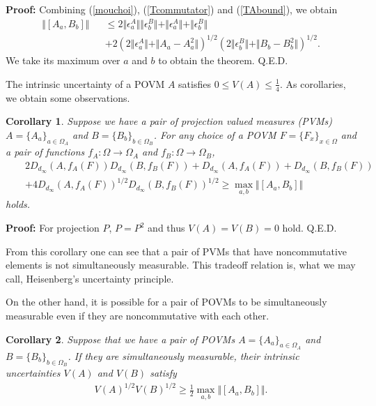 \documentclass[showpacs,preprintnumbers,amsmath,amssymb]{revtex4}
\newtheorem{corollary}{Corollary}
\begin{document}
{\bf Proof:}
Combining (\ref{mouchoi}), (\ref{Tcommutator}) and 
(\ref{TAbound}), we obtain
\begin{eqnarray}
\Vert [A_a,B_b]
\Vert &&
\leq 2\Vert \epsilon^A_a \Vert \Vert \epsilon^B_b \Vert 
+\Vert \epsilon^A_a \Vert +\Vert \epsilon^B_b \Vert 
\nonumber
\\
&&
+2(2\Vert \epsilon^A_a\Vert +\Vert A_a-A_a^2\Vert
)^{1/2}
(2\Vert \epsilon^B_b\Vert +\Vert B_b-B_b^2\Vert
)^{1/2}.
\label{proof}
\end{eqnarray}
 We take its maximum over  
$a$ and $b$ to obtain the theorem.
\hfill Q.E.D. 
\par
The intrinsic uncertainty of a POVM $A$ satisfies 
$0\leq V(A)\leq \frac{1}{4}$. 
As corollaries, we obtain some observations.
\begin{corollary}\label{forPVM}
Suppose we have a pair of projection valued measures (PVMs) 
$A=\{A_a\}_{a\in \Omega_A}$ and $B=\{B_b\}_{b \in \Omega_B}$. 
For any choice of a POVM 
$F=\{F_x\}_{x\in \Omega}$ and a pair of functions 
$f_A: \Omega \to \Omega_A$ and $f_B: \Omega \to \Omega_B$, 
\begin{eqnarray*}
&&2 D_{d_{\infty}}(A, f_A(F))D_{d_{\infty}}(B, f_B(F))
+D_{d_{\infty}}(A,f_A(F))+D_{d_{\infty}}(B,f_B(F))
\\
&&
+4 D_{d_{\infty}}(A,f_A(F))^{1/2}D_{d_{\infty}}(B,f_B(F))^{1/2}
\geq \max_{a,b}\Vert[A_a,B_b]\Vert
\end{eqnarray*}
holds.
\end{corollary}
{\bf Proof:}
For projection $P$, $P =P^2$ and thus $V(A)=V(B)=0$ hold.
\hfill Q.E.D.
\par
From this corollary one can see that 
a pair of PVMs that have noncommutative elements 
is not simultaneously measurable. 
This tradeoff relation is, what we may call, 
Heisenberg's uncertainty principle. 
\par
On the other hand, it is possible for a pair of POVMs 
to be simultaneously measurable even if they are 
noncommutative with each other. 
\begin{corollary}
Suppose that we have a pair of POVMs $A=\{A_a\}_{a\in \Omega_A}$ 
and $B=\{B_b\}_{b\in \Omega_B}$. 
If they are simultaneously measurable, their 
intrinsic uncertainties $V(A)$ and $V(B)$ satisfy
\begin{eqnarray*}
V(A)^{1/2}V(B)^{1/2}\geq \frac{1}{2} \max_{a,b}\Vert [A_a, B_b]\Vert.
\end{eqnarray*}
\end{corollary}
\end{document}
